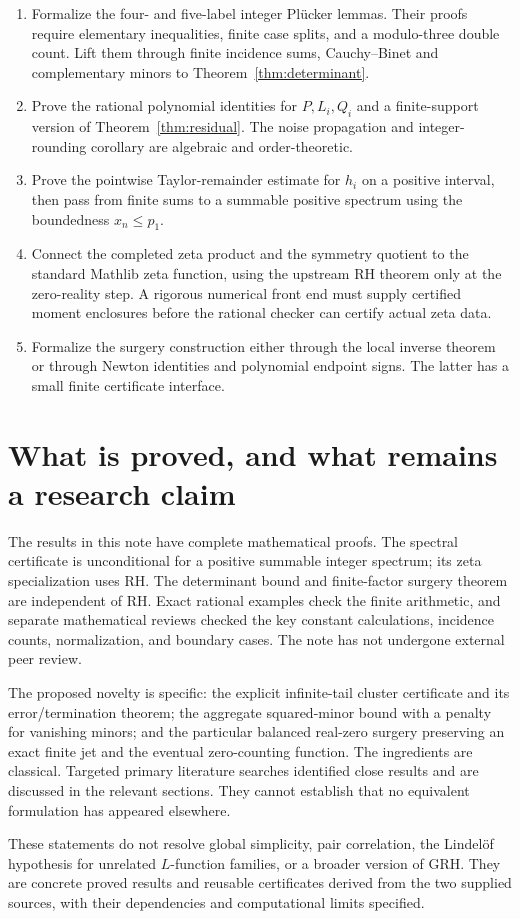 \begin{enumerate}
\item Formalize the four- and five-label integer Pl\"ucker lemmas. Their
proofs require elementary inequalities, finite case splits, and a modulo-three
double count. Lift them through finite incidence sums, Cauchy--Binet and
complementary minors to Theorem~\ref{thm:determinant}.
\item Prove the rational polynomial identities for $P,L_i,Q_i$ and a
finite-support version of Theorem~\ref{thm:residual}. The noise propagation
and integer-rounding corollary are algebraic and order-theoretic.
\item Prove the pointwise Taylor-remainder estimate for $h_i$ on a positive
interval, then pass from finite sums to a summable positive spectrum using
the boundedness $x_n\le p_1$.
\item Connect the completed zeta product and the symmetry quotient to the
standard Mathlib zeta function, using the upstream RH theorem only at the
zero-reality step. A rigorous numerical front end must supply certified
moment enclosures before the rational checker can certify actual zeta data.
\item Formalize the surgery construction either through the local inverse
theorem or through Newton identities and polynomial endpoint signs.
The latter has a small finite certificate interface.
\end{enumerate}

\section{What is proved, and what remains a research claim}

The results in this note have complete mathematical proofs. The spectral
certificate is unconditional for a positive summable integer spectrum;
its zeta specialization uses RH. The determinant bound and finite-factor
surgery theorem are independent of RH. Exact rational examples check the
finite arithmetic, and separate mathematical reviews checked the key
constant calculations, incidence counts, normalization, and boundary cases.
The note has not undergone external peer review.

The proposed novelty is specific: the explicit infinite-tail cluster
certificate and its error/termination theorem; the aggregate
squared-minor bound with a penalty for vanishing minors; and the particular
balanced real-zero surgery preserving an exact finite jet and the eventual
zero-counting function. The ingredients are classical. Targeted primary
literature searches identified close results and are discussed in the
relevant sections. They cannot establish that no equivalent formulation
has appeared elsewhere.

These statements do not resolve global simplicity, pair correlation,
the Lindel\"of hypothesis for unrelated $L$-function families, or a broader
version of GRH. They are concrete proved results and reusable certificates
derived from the two supplied sources, with their dependencies and
computational limits specified.
